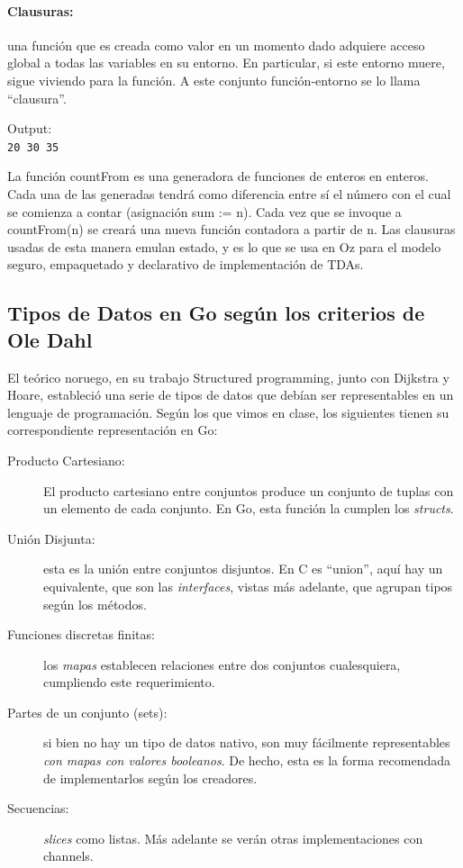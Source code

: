 \documentclass{article}
\begin{document}
\paragraph{Clausuras:} una función que es creada como valor en un momento dado adquiere acceso global a todas las variables en su entorno. En particular, si este entorno muere, sigue viviendo para la función. A este conjunto función-entorno se lo llama ``clausura''.

Output:\\
\verb|20 30 35|

La función countFrom es una generadora de funciones de enteros en enteros. Cada una de las generadas tendrá como diferencia entre sí el número con el cual se comienza a contar (asignación sum := n). Cada vez que se invoque a countFrom(n) se creará una nueva función contadora a partir de n. Las clausuras usadas de esta manera emulan estado, y es lo que se usa en Oz para el modelo seguro, empaquetado y declarativo de implementación de TDAs.


\subsection{Tipos de Datos en Go según los criterios de Ole Dahl}
El teórico noruego, en su trabajo Structured programming\cite{ole}, junto con Dijkstra y Hoare, estableció una serie de tipos de datos que debían ser representables en un lenguaje de programación. Según los que vimos en clase, los siguientes tienen su correspondiente representación en Go:
\begin{description}
\item[Producto Cartesiano:] El producto cartesiano entre conjuntos produce un conjunto de tuplas con un elemento de cada conjunto. En Go, esta función la cumplen los \emph{structs}.
\item[Unión Disjunta:] esta es la unión entre conjuntos disjuntos. En C es ``union'', aquí hay un equivalente, que son las \emph{interfaces}, vistas más adelante, que agrupan tipos según los métodos.
\item[Funciones discretas finitas:] los \emph{mapas} establecen relaciones entre dos conjuntos cualesquiera, cumpliendo este requerimiento.
\item[Partes de un conjunto (sets):] si bien no hay un tipo de datos nativo, son muy fácilmente representables \emph{con mapas con valores booleanos}. De hecho, esta es la forma recomendada de implementarlos según los creadores\cite{sets}.
\item[Secuencias:] \emph{slices} como listas. Más adelante se verán otras implementaciones con channels. %
\end{description}
\end{document}
